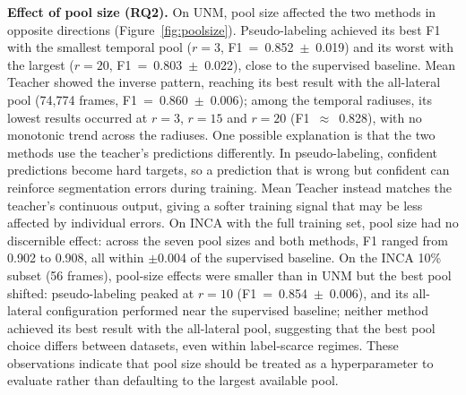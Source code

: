 \documentclass[
  msc,
  american
]{ThesisPUC_v2}
\begin{document}
\textbf{Effect of pool size (RQ2).} On UNM, pool size affected the two methods in opposite directions (Figure~\ref{fig:poolsize}). Pseudo-labeling achieved its best F1 with the smallest temporal pool ($r=3$, F1~=~0.852~$\pm$~0.019) and its worst with the largest ($r=20$, F1~=~0.803~$\pm$~0.022), close to the supervised baseline. Mean Teacher showed the inverse pattern, reaching its best result with the all-lateral pool (74{,}774 frames, F1~=~0.860~$\pm$~0.006); among the temporal radiuses, its lowest results occurred at $r=3$, $r=15$ and $r=20$ (F1~$\approx$~0.828), with no monotonic trend across the radiuses. One possible explanation is that the two methods use the teacher's predictions differently. In pseudo-labeling, confident predictions become hard targets, so a prediction that is wrong but confident can reinforce segmentation errors during training. Mean Teacher instead matches the teacher's continuous output, giving a softer training signal that may be less affected by individual errors. On INCA with the full training set, pool size had no discernible effect: across the seven pool sizes and both methods, F1 ranged from 0.902 to 0.908, all within $\pm$0.004 of the supervised baseline. On the INCA 10\% subset (56 frames), pool-size effects were smaller than in UNM but the best pool shifted: pseudo-labeling peaked at $r=10$ (F1~=~0.854~$\pm$~0.006), and its all-lateral configuration performed near the supervised baseline; neither method achieved its best result with the all-lateral pool, suggesting that the best pool choice differs between datasets, even within label-scarce regimes. These observations indicate that pool size should be treated as a hyperparameter to evaluate rather than defaulting to the largest available pool.
\end{document}
